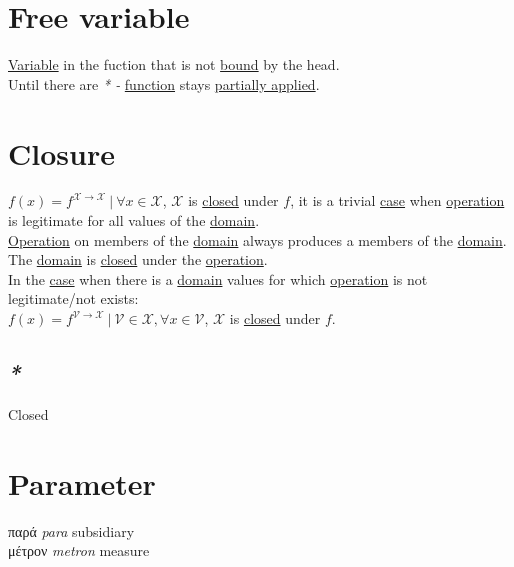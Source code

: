 \documentclass[a4paper,14pt,oneside]{book}
\begin{document}
\section{\label{org0c493d9}Free variable}
\label{sec:org46faa65}
\hyperref[org029d8fd]{Variable} in the fuction that is not \hyperref[org4508e79]{bound} by the head.\\
Until there are \emph{* -} \hyperref[org8cc2ae4]{function} stays \hyperref[org231ab20]{partially applied}.\\

\section{\label{org0c0e277}Closure}
\label{sec:org4a71881}
\(f(x) = f^{\mathcal{X \to X}} \ | \ \forall x \in \mathcal{X}\), \(\mathcal{X}\) is \hyperref[orgcda5e16]{closed} under \(f\), it is a trivial \hyperref[orge2ba09c]{case} when \hyperref[org6ed0c27]{operation} is legitimate for all values of the \hyperref[orgeb6ec49]{domain}.\\

\hyperref[org6ed0c27]{Operation} on members of the \hyperref[orgeb6ec49]{domain} always produces a members of the \hyperref[orgeb6ec49]{domain}. The \hyperref[orgeb6ec49]{domain} is \hyperref[orgcda5e16]{closed} under the \hyperref[org6ed0c27]{operation}.\\

In the \hyperref[orge2ba09c]{case} when there is a \hyperref[orgeb6ec49]{domain} values for which \hyperref[org6ed0c27]{operation} is not legitimate/not exists:\\

\(f(x) = f^{\mathcal{V \to X}} \ | \ \mathcal{V \in X}, \forall x \in \mathcal{V}\), \(\mathcal{X}\) is \hyperref[orgcda5e16]{closed} under \(f\).\\

\subsection{\emph{*}}
\label{sec:orgfd1e732}

\label{orgcda5e16}Closed\\

\section{\label{orged2015b}Parameter}
\label{sec:orgf836d63}
παρά \emph{para} subsidiary\\
μέτρον \emph{metron} measure\\
\end{document}
